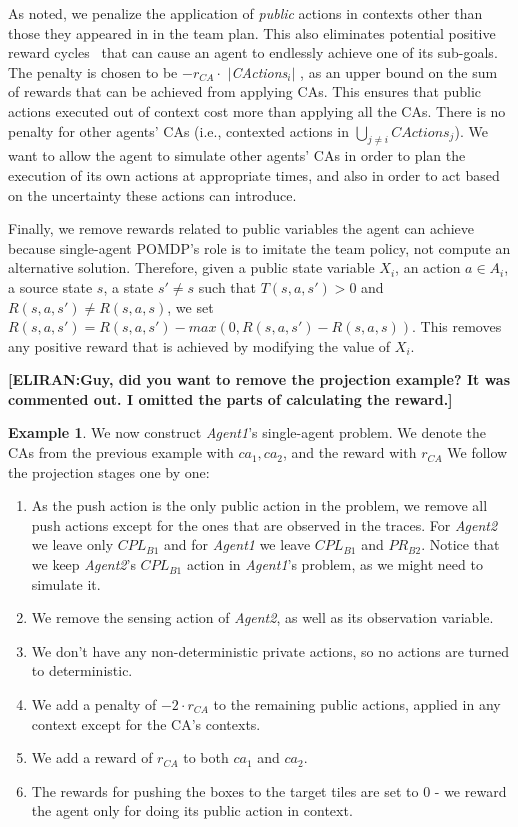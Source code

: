 \documentclass[letterpaper]{article} %
\theoremstyle{definition}
\newtheorem{example}{Example}
\newcommand{\eliran}[1]{\textbf{[\color{red}ELIRAN:#1]}}
\newcommand{\ronen}[1]{\textbf{[\color{blue}RONEN:#1]}}
\newcommand{\cact}[1]{{\em CActions$_#1$}}
\newcommand{\mcact}[1]{{\mathit{CActions}_#1}}
\begin{document}
As noted, we penalize the application of \emph{public} actions in contexts other
than those they appeared in in the team plan. This also eliminates 
potential positive reward cycles~\cite{RLCYCLES} that can cause an agent to endlessly achieve one of its sub-goals. 
%
The penalty is chosen to be $-r_{CA} \cdot$ $|$\cact{i}$|$
, as an upper bound on the sum of rewards that can be achieved from applying CAs. This ensures that public actions executed out of context cost more than applying all the CAs. There is no penalty for other agents' CAs
(i.e., contexted actions in $\bigcup_{j\neq i} \mcact{j}$). We want
to allow the agent to simulate other agents' CAs in order to plan the execution of its own actions at appropriate times, and also in order to act based on the uncertainty these actions can introduce.

Finally, we remove rewards related to public variables the agent
can achieve because single-agent POMDP's role is to imitate the team policy, not compute an alternative solution.
Therefore, given a public state variable $X_i$, an action $a \in A_i$, a source state $s$, a state $s' \neq s$ such that $T(s,a,s')>0$ and $R(s, a, s')\neq R(s, a, s)$, we set $R(s,a,s') = R(s,a,s') - \textit{max}\left(0, R(s,a,s') - R(s,a,s)\right)$. This removes any positive reward that is achieved by modifying the value of $X_i$.

\eliran{Guy, did you want to remove the projection example? It was commented out. I omitted the parts of calculating the reward.}
\begin{example}
We now construct \emph{Agent1}'s single-agent problem. We denote the CAs from the previous example with $ca_1, ca_2$, and the reward with $r_{CA}$ We follow the projection stages one by one:
\begin{enumerate}
    \item As the push action is the only public action in the problem, we remove all push actions except for the ones that are observed in the traces. For \emph{Agent2} we leave only $CPL_{B1}$ and for \emph{Agent1} we leave $CPL_{B1}$ and $PR_{B2}$. Notice that we keep \emph{Agent2}'s $CPL_{B1}$ action in \emph{Agent1}'s problem, as we might need to simulate it.
    \item We remove the sensing action of \emph{Agent2}, as well as its observation variable.
    \item We don't have any non-deterministic private actions, so no actions are turned to deterministic.
    \item We add a penalty of $-2\cdot r_{CA}$ to the remaining public actions, applied in any context except for the CA's contexts.
    \item We add a reward of $r_{CA}$ to both $ca_1$ and $ca_2$.
    \item The rewards for pushing the boxes to the target tiles are set to 0 - we reward the agent only for doing its public action in context.
\end{enumerate}
\end{example}
\end{document}
